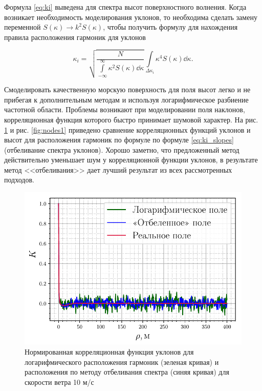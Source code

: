 Формула \eqref{eq:ki} выведена для спектра высот поверхностного волнения. Когда
возникает необходимость моделирования уклонов, то необходима сделать замену
переменной $S(\kappa) \to k^2 S(\kappa)$, чтобы получить формулу для нахождения правила
расположения гармоник для уклонов


\begin{equation}
    \label{eq:ki_slopes}
    {
        \kappa_i = \sqrt{\frac{N}{\int\limits_{-\infty}^{\infty} \kappa^2
        S(\kappa) \dd \kappa }} \int\limits_{\Delta \kappa_i}
        \kappa^4 S(\kappa) \dd \kappa. 
    }
\end{equation}

Смоделировать качественную морскую поверхность для поля высот легко и не
прибегая к дополнительным методам и используя логарифмическое разбиение
частотной области. Проблемы возникают при моделировании поля наклонов,
корреляционная функция которого быстро принимает шумовой характер.  
На рис. \ref{fig:nodes} и рис. \ref{fig:nodes1} приведено сравнение
корреляционных функций уклонов и высот для расположения гармоник по формуле по
формуле \eqref{eq:ki_slopes} (отбеливание спектра уклонов). Хорошо заметно, что
предложенный метод действительно уменьшает шум у корреляционной функции
уклонов, в результате метод <<отбеливания>> дает лучший результат из всех рассмотренных подходов. 

\begin{figure}[h!]
    \centering
    \includegraphics[width=0.6\linewidth]{fig/correlation_angles_wa.pdf}
    \caption{ Нормированная корреляционная функция уклонов для логарифмического расположения
    гармоник (зеленая кривая) и расположения по методу отбеливания спектра
(синяя кривая) для скорости ветра 10 м/с}
    \label{fig:nodes}
\end{figure}

